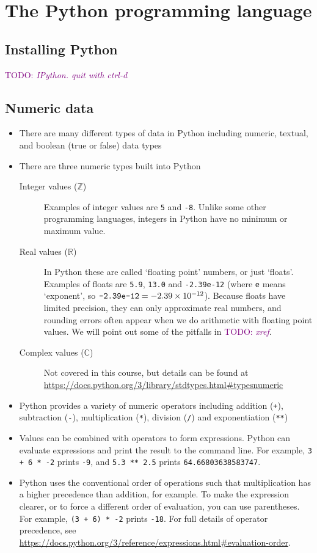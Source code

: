 \documentclass[a4paper,twoside]{memoir}
\newcommand{\shellcmd}{\texttt}
\newcommand{\TODO}[1]{\textcolor{purple}{TODO: \emph{#1}}}
\begin{document}
\chapter{The Python programming language}

\section{Installing Python}

\TODO{IPython.  quit with ctrl-d}

\section{Numeric data}
\begin{itemize}
\item There are many different types of data in Python including numeric, textual, and boolean (true or false) data types
\item There are three numeric types built into Python
	\begin{description}
	\item[Integer values ($\mathbb{Z}$)]{Examples of integer values are \shellcmd{5} and \shellcmd{-8}.  Unlike some other programming languages, integers in Python have no minimum or maximum value.}
	\item[Real values ($\mathbb{R}$)]{In Python these are called `floating point' numbers, or just `floats'.  Examples of floats are \shellcmd{5.9}, \shellcmd{13.0} and \shellcmd{-2.39e-12} (where \shellcmd{e} means `exponent', so $\text{\shellcmd{-2.39e-12}} = \num{-2.39e-12}$).  Because floats have limited precision, they can only approximate real numbers, and rounding errors often appear when we do arithmetic with floating point values.  We will point out some of the pitfalls in \TODO{xref}.}
	\item[Complex values ($\mathbb{C}$)]{Not covered in this course, but details can be found at \url{https://docs.python.org/3/library/stdtypes.html#typesnumeric}}
	\end{description}
\item Python provides a variety of numeric operators including addition (\shellcmd{+}), subtraction (\shellcmd{-}), multiplication (\shellcmd{*}), division (\shellcmd{/}) and exponentiation (\shellcmd{**})
\item Values can be combined with operators to form expressions.  Python can evaluate expressions and print the result to the command line.  For example, \shellcmd{3 + 6 * -2} prints \shellcmd{-9}, and \shellcmd{5.3 ** 2.5} prints \shellcmd{64.66803638583747}.
\item Python uses the conventional order of operations such that multiplication has a higher precedence than addition, for example.  To make the expression clearer, or to force a different order of evaluation, you can use parentheses.  For example, \shellcmd{(3 + 6) * -2} prints \shellcmd{-18}.  For full details of operator precedence, see \url{https://docs.python.org/3/reference/expressions.html#evaluation-order}.
\end{itemize}
\end{document}
